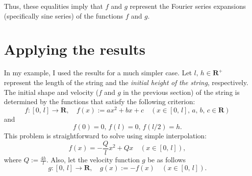 \documentclass[12pt]{article}
\begin{document}
Thus, these equalities imply that $f$ and $g$ represent the Fourier series expansions (specifically sine series) of the functions $f$ and $g$.

\section{Applying the results}

In my example, I used the results for a much simpler case. Let $l, \, h \in \mathbf{R}^+$ represent the length of the string and the \textit{initial height of the string}, respectively. The initial shape and velocity ($f$ and $g$ in the previous section) of the string is determined by the functions that satisfy the following criterion:
$$
f : [0, \, l] \to \mathbf{R}, \quad f(x) := ax^2 + bx + c \quad (x \in [0, \, l], \, a, \, b, \, c \in \mathbf{R})
$$
and
$$
f(0) = 0, \, f(l) = 0, \, f(l/2) = h.
$$
This problem is straightforward to solve using simple interpolation:
$$
f(x) = - \frac{Q}{l}x^2 + Qx  \quad (x \in [0, \, l]),
$$
where $ Q := \frac{4h}{l} $. Also, let the velocity function $g$ be as follows
$$
g : [0, \, l] \to \mathbf{R}, \quad g(x) := -f(x) \quad (x \in [0, \, l]).
$$

\begin{center}
\end{center}
\end{document}
